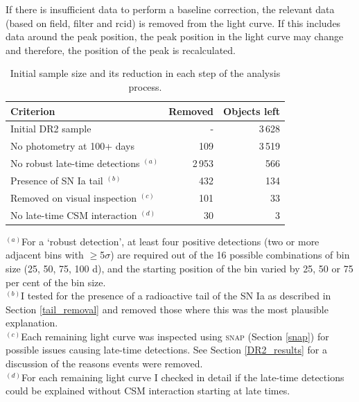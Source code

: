 \documentclass[a4paper,oneside,12pt, class=Latex/Classes/PhDthesisPSnPDF, crop=false]{standalone}
\begin{document}
If there is insufficient data to perform a baseline correction, the relevant data (based on field, filter and rcid) is removed from the light curve. If this includes data around the peak position, the peak position in the light curve may change and therefore, the position of the peak is recalculated. 


\begin{table}
 \centering
 \caption{Initial sample size and its reduction in each step of the analysis process.}
 \begin{tabular}{lrr}
  \hline
  Criterion & Removed & Objects left\\
  \hline
  Initial DR2 sample & - & 3\,628\\
  No photometry at 100+ days & 109 & 3\,519\\
   No robust late-time detections $^{(a)}$ & 2\,953 & 566\\
  Presence of SN Ia tail $^{(b)}$ & 432 & 134\\
  Removed on visual inspection $^{(c)}$ & 101 & 33\\
  No late-time CSM interaction $^{(d)}$ & 30 & 3\\
  \hline
 \end{tabular}
 \label{obj_breakdown}
\begin{flushleft}
$^{(a)}$For a `robust detection', at least four positive detections (two or more adjacent bins with $\ge$5$\sigma$) are required out of the 16 possible combinations of bin size (25, 50, 75, 100 d), and the starting position of the bin varied by 25, 50 or 75 per cent of the bin size. \\
$^{(b)}$I tested for the presence of a radioactive tail of the SN Ia as described in Section \ref{tail_removal} and removed those where this was the most plausible explanation. \\
$^{(c)}$Each remaining light curve was inspected using \textsc{snap} (Section \ref{snap}) for possible issues causing late-time detections. See Section \ref{DR2_results} for a discussion of the reasons events were removed.\\
$^{(d)}$For each remaining light curve I checked in detail if the late-time detections could be explained without CSM interaction starting at late times.
\end{flushleft}
\end{table}
\end{document}
